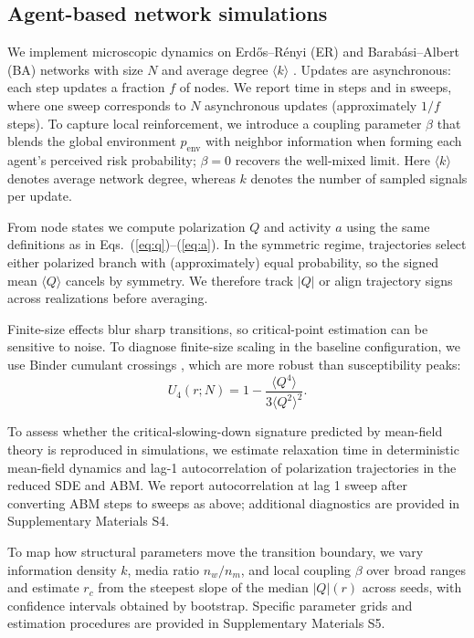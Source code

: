 \documentclass[11pt]{article}
\begin{document}
\subsection{Agent-based network simulations}
We implement microscopic dynamics on Erd\H{o}s--R\'enyi (ER) and Barab\'asi--Albert (BA) networks with size $N$ and average degree $\langle k\rangle$ \citep{Erdos1959,Barabasi1999,PastorSatorras2015}. Updates are asynchronous: each step updates a fraction $f$ of nodes. We report time in steps and in sweeps, where one sweep corresponds to $N$ asynchronous updates (approximately $1/f$ steps). To capture local reinforcement, we introduce a coupling parameter $\beta$ that blends the global environment $p_{\text{env}}$ with neighbor information when forming each agent's perceived risk probability; $\beta=0$ recovers the well-mixed limit. Here $\langle k\rangle$ denotes average network degree, whereas $k$ denotes the number of sampled signals per update.

From node states we compute polarization $Q$ and activity $a$ using the same definitions as in Eqs.~(\ref{eq:q})--(\ref{eq:a}). In the symmetric regime, trajectories select either polarized branch with (approximately) equal probability, so the signed mean $\langle Q\rangle$ cancels by symmetry. We therefore track $|Q|$ or align trajectory signs across realizations before averaging.

Finite-size effects blur sharp transitions, so critical-point estimation can be sensitive to noise. To diagnose finite-size scaling in the baseline configuration, we use Binder cumulant crossings \citep{Binder1981,NewmanBarkema1999}, which are more robust than susceptibility peaks:
\begin{equation}
U_4(r;N)=1-\frac{\langle Q^4\rangle}{3\langle Q^2\rangle^2}.
\label{eq:binder}
\end{equation}

To assess whether the critical-slowing-down signature predicted by mean-field theory is reproduced in simulations, we estimate relaxation time in deterministic mean-field dynamics and lag-1 autocorrelation of polarization trajectories in the reduced SDE and ABM. We report autocorrelation at lag 1 sweep after converting ABM steps to sweeps as above; additional diagnostics are provided in Supplementary Materials S4.

To map how structural parameters move the transition boundary, we vary information density $k$, media ratio $n_w/n_m$, and local coupling $\beta$ over broad ranges and estimate $r_c$ from the steepest slope of the median $|Q|(r)$ across seeds, with confidence intervals obtained by bootstrap. Specific parameter grids and estimation procedures are provided in Supplementary Materials S5.
\end{document}
